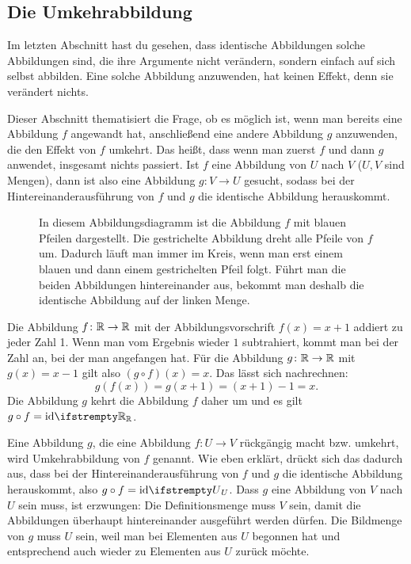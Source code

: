 \documentclass[../../main.tex]{subfiles}
\begin{document}
\subsection{Die Umkehrabbildung}
\label{sec:abbildungen_umkehrabbildung}

Im letzten Abschnitt hast du gesehen, dass identische Abbildungen solche Abbildungen sind, die ihre Argumente nicht verändern, sondern einfach auf sich selbst abbilden. Eine solche Abbildung anzuwenden, hat keinen Effekt, denn sie verändert nichts.

Dieser Abschnitt thematisiert die Frage, ob es möglich ist, wenn man bereits eine Abbildung $f$ angewandt hat, anschließend eine andere Abbildung $g$ anzuwenden, die den Effekt von $f$ umkehrt. Das heißt, dass wenn man zuerst $f$ und dann $g$ anwendet, insgesamt nichts passiert. Ist $f$ eine Abbildung von $U$ nach $V$ ($U,V$ sind Mengen), dann ist also eine Abbildung $g\colon V\rightarrow U$ gesucht, sodass bei der Hintereinanderausführung von $f$ und $g$ die identische Abbildung herauskommt.

\begin{figure}[ht]
    \centering
    
    \caption{In diesem Abbildungsdiagramm ist die Abbildung $f$ mit blauen Pfeilen dargestellt. Die gestrichelte Abbildung dreht alle Pfeile von $f$ um. Dadurch läuft man immer im Kreis, wenn man erst einem blauen und dann einem gestrichelten Pfeil folgt. Führt man die beiden Abbildungen hintereinander aus, bekommt man deshalb die identische Abbildung auf der linken Menge.}
\end{figure}

\begin{example}
    Die Abbildung $f\colon\mathbb{R}\rightarrow\mathbb{R}$ mit der Abbildungsvorschrift $f(x)=x+1$ addiert zu jeder Zahl 1. Wenn man vom Ergebnis wieder $1$ subtrahiert, kommt man bei der Zahl an, bei der man angefangen hat. Für die Abbildung $g\colon\mathbb{R}\rightarrow\mathbb{R}$ mit $g(x)=x-1$ gilt also $(g\circ f)(x)=x$. Das lässt sich nachrechnen:
    \[g(f(x))=g(x+1)=(x+1)-1=x.\]
    Die Abbildung $g$ kehrt die Abbildung $f$ daher um und es gilt $g\circ f=\ident[\Real]$.
\end{example}

Eine Abbildung $g$, die eine Abbildung $f\colon U\rightarrow V$ rückgängig macht bzw. umkehrt, wird Umkehrabbildung von $f$ genannt. Wie eben erklärt, drückt sich das dadurch aus, dass bei der Hintereinanderausführung von $f$ und $g$ die identische Abbildung herauskommt, also $g\circ f=\ident[U]$. Dass $g$ eine Abbildung von $V$ nach $U$ sein muss, ist erzwungen: Die Definitionsmenge muss $V$ sein, damit die Abbildungen überhaupt hintereinander ausgeführt werden dürfen. Die Bildmenge von $g$ muss $U$ sein, weil man bei Elementen aus $U$ begonnen hat und entsprechend auch wieder zu Elementen aus $U$ zurück möchte.
\end{document}
